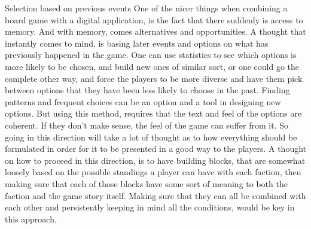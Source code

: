 Selection based on previous events
One of the nicer things when combining a board game with a digital application, is the fact that there suddenly is access to memory. And with memory, comes alternatives and opportunities. A thought that instantly comes to mind, is basing later events and options on what has previously happened in the game. One can use statistics to see which options is more likely to be chosen, and build new ones of similar sort, or one could go the complete other way, and force the players to be more diverse and have them pick between options that they have been less likely to choose in the past. Finding patterns and frequent choices can be an option and a tool in designing new options. But using this method, requires that the text and feel of the options are coherent. If they don't make sense, the feel of the game can suffer from it. So going in this direction will take a lot of thought as to how everything should be formulated in order for it to be presented in a good way to the players. A thought on how to proceed in this direction, is to have building blocks, that are somewhat loosely based on the possible standings a player can have with each faction, then making sure that each of those blocks have some sort of meaning to both the faction and the game story itself. Making sure that they can all be combined with each other and persistently keeping in mind all the conditions, would be key in this approach.\\

